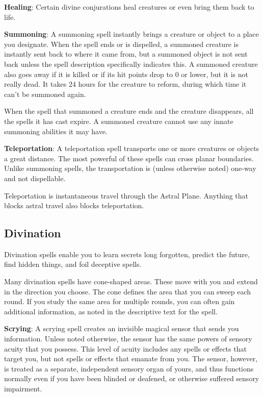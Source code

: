 \textbf{Healing}: Certain divine conjurations heal creatures or even bring them back to life.
				
\textbf{Summoning}: A summoning spell instantly brings a creature or object to a place you designate. When the spell ends or is dispelled, a summoned creature is instantly sent back to where it came from, but a summoned object is not sent back unless the spell description specifically indicates this. A summoned creature also goes away if it is killed or if its hit points drop to 0 or lower, but it is not really dead. It takes 24 hours for the creature to reform, during which time it can't be summoned again.
				
When the spell that summoned a creature ends and the creature disappears, all the spells it has cast expire. A summoned creature cannot use any innate summoning abilities it may have.
				
\textbf{Teleportation}: A teleportation spell transports one or more creatures or objects a great distance. The most powerful of these spells can cross planar boundaries. Unlike summoning spells, the transportation is (unless otherwise noted) one-way and not dispellable.
				
Teleportation is instantaneous travel through the Astral Plane. Anything that blocks astral travel also blocks teleportation.
				
\subsection{Divination}

				
Divination spells enable you to learn secrets long forgotten, predict the future, find hidden things, and foil deceptive spells.
				
Many divination spells have cone-shaped areas. These move with you and extend in the direction you choose. The cone defines the area that you can sweep each round. If you study the same area for multiple rounds, you can often gain additional information, as noted in the descriptive text for the spell.
				
\textbf{Scrying}: A scrying spell creates an invisible magical sensor that sends you information. Unless noted otherwise, the sensor has the same powers of sensory acuity that you possess. This level of acuity includes any spells or effects that target you, but not spells or effects that emanate from you. The sensor, however, is treated as a separate, independent sensory organ of yours, and thus functions normally even if you have been blinded or deafened, or otherwise suffered sensory impairment.
				
